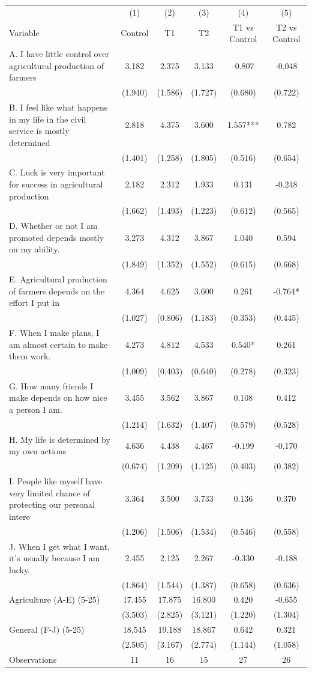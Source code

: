 \begin{tabular}{l*{5}c}
\hline\hline
 & (1) & (2) & (3) & (4) & (5) \\
Variable & Control & T1 & T2 & T1 vs Control & T2 vs Control \\
\hline
A. I have little control over agricultural production of farmers&3.182&2.375&3.133&-0.807&-0.048\\
&(1.940)&(1.586)&(1.727)&(0.680)&(0.722)\\
B. I feel like what happens in my life in the civil service is mostly determined&2.818&4.375&3.600&1.557***&0.782\\
&(1.401)&(1.258)&(1.805)&(0.516)&(0.654)\\
C. Luck is very important for success in agricultural production&2.182&2.312&1.933&0.131&-0.248\\
&(1.662)&(1.493)&(1.223)&(0.612)&(0.565)\\
D. Whether or not I am promoted depends mostly on my ability.&3.273&4.312&3.867&1.040&0.594\\
&(1.849)&(1.352)&(1.552)&(0.615)&(0.668)\\
E. Agricultural production of farmers depends on the effort I put in&4.364&4.625&3.600&0.261&-0.764*\\
&(1.027)&(0.806)&(1.183)&(0.353)&(0.445)\\
F. When I make plans, I am almost certain to make them work.&4.273&4.812&4.533&0.540*&0.261\\
&(1.009)&(0.403)&(0.640)&(0.278)&(0.323)\\
G. How many friends I make depends on how nice a person I am.&3.455&3.562&3.867&0.108&0.412\\
&(1.214)&(1.632)&(1.407)&(0.579)&(0.528)\\
H. My life is determined by my own actions&4.636&4.438&4.467&-0.199&-0.170\\
&(0.674)&(1.209)&(1.125)&(0.403)&(0.382)\\
I. People like myself have very limited chance of protecting our personal intere&3.364&3.500&3.733&0.136&0.370\\
&(1.206)&(1.506)&(1.534)&(0.546)&(0.558)\\
J. When I get what I want, it’s usually because I am lucky.&2.455&2.125&2.267&-0.330&-0.188\\
&(1.864)&(1.544)&(1.387)&(0.658)&(0.636)\\
Agriculture (A-E) (5-25)&17.455&17.875&16.800&0.420&-0.655\\
&(3.503)&(2.825)&(3.121)&(1.220)&(1.304)\\
General (F-J) (5-25)&18.545&19.188&18.867&0.642&0.321\\
&(2.505)&(3.167)&(2.774)&(1.144)&(1.058)\\
\hline
Observations & 11 & 16 & 15 & 27 & 26 \\
\hline\hline
\end{tabular}
